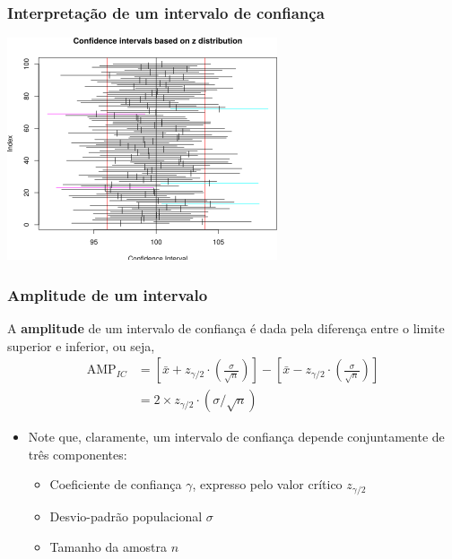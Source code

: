 \documentclass[11pt]{beamer}
\begin{document}
\begin{frame}
\frametitle{Interpretação de um intervalo de confiança}

\begin{center}\includegraphics[width=0.7\linewidth]{figs/unnamed_chunk_2_1} \end{center}
\end{frame}


\begin{frame}
\frametitle{Amplitude de um intervalo}

A \textbf{amplitude} de um intervalo de confiança é dada pela diferença
entre o limite superior e inferior, ou seja, \begin{align*}
\text{AMP}_{IC} &=
  \left[ \bar{x} + z_{\gamma/2} \cdot
  \left( \frac{\sigma}{\sqrt{n}} \right) \right] -
  \left[ \bar{x} - z_{\gamma/2} \cdot
  \left( \frac{\sigma}{\sqrt{n}} \right) \right] \\
 &= 2 \times z_{\gamma/2} \cdot (\sigma/\sqrt{n})
\end{align*}

\begin{itemize}
\item
  Note que, claramente, um intervalo de confiança depende conjuntamente
  de três componentes:

  \begin{itemize}
  \item
    Coeficiente de confiança \(\gamma\), expresso pelo valor crítico
    \(z_{\gamma/2}\)
  \item
    Desvio-padrão populacional \(\sigma\)
  \item
    Tamanho da amostra \(n\)
  \end{itemize}
\end{itemize}
\end{frame}
\end{document}
